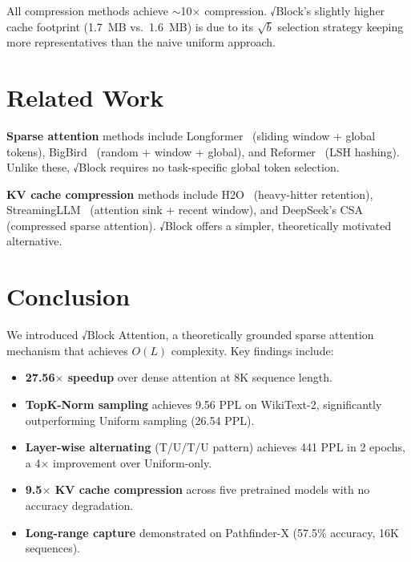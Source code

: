 \documentclass[11pt,a4paper]{article}
\begin{document}
All compression methods achieve $\sim$10$\times$ compression. √Block's slightly higher cache footprint (1.7~MB vs.\ 1.6~MB) is due to its $\sqrt{b}$ selection strategy keeping more representatives than the naive uniform approach.

\section{Related Work}
\label{sec:related}

\textbf{Sparse attention} methods include Longformer~\cite{beltagy2020longformer} (sliding window + global tokens), BigBird~\cite{zaheer2020bigbird} (random + window + global), and Reformer~\cite{kitaev2020reformer} (LSH hashing). Unlike these, √Block requires no task-specific global token selection.

\textbf{KV cache compression} methods include H2O~\cite{zhang2023h2o} (heavy-hitter retention), StreamingLLM~\cite{xiao2023streaming} (attention sink + recent window), and DeepSeek's CSA~\cite{deepseek2024} (compressed sparse attention). √Block offers a simpler, theoretically motivated alternative.

\section{Conclusion}
\label{sec:conclusion}

We introduced √Block Attention, a theoretically grounded sparse attention mechanism that achieves $O(L)$ complexity. Key findings include:

\begin{itemize}
    \item \textbf{27.56$\times$ speedup} over dense attention at 8K sequence length.
    \item \textbf{TopK-Norm sampling} achieves 9.56 PPL on WikiText-2, significantly outperforming Uniform sampling (26.54 PPL).
    \item \textbf{Layer-wise alternating} (T/U/T/U pattern) achieves 441 PPL in 2 epochs, a 4$\times$ improvement over Uniform-only.
    \item \textbf{9.5$\times$ KV cache compression} across five pretrained models with no accuracy degradation.
    \item \textbf{Long-range capture} demonstrated on Pathfinder-X (57.5\% accuracy, 16K sequences).
\end{itemize}
\end{document}
